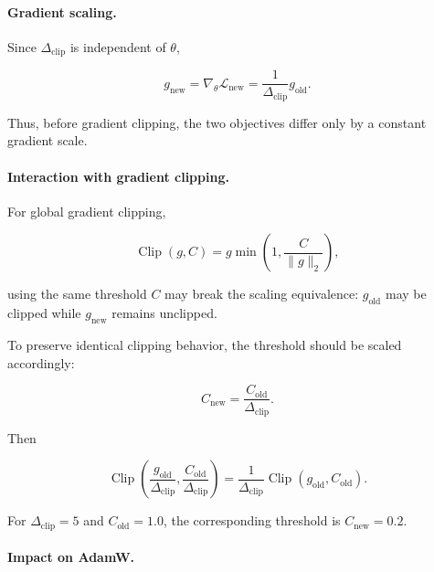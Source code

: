 \documentclass{article} %
\begin{document}
\paragraph{Gradient scaling.}

Since $\Delta_{\mathrm{clip}}$ is independent of $\theta$,

\begin{equation}
g_{\mathrm{new}}
=
\nabla_\theta \mathcal{L}_{\mathrm{new}}
=
\frac{1}{\Delta_{\mathrm{clip}}}
g_{\mathrm{old}}.
\end{equation}

Thus, before gradient clipping, the two objectives differ only by a constant gradient scale.

\paragraph{Interaction with gradient clipping.}

For global gradient clipping,

\begin{equation}
\operatorname{Clip}(g,C)
=
g\min\left(1,\frac{C}{\|g\|_2}\right),
\end{equation}

using the same threshold $C$ may break the scaling equivalence: $g_{\mathrm{old}}$ may be clipped while $g_{\mathrm{new}}$ remains unclipped.

To preserve identical clipping behavior, the threshold should be scaled accordingly:

\begin{equation}
C_{\mathrm{new}}
=
\frac{C_{\mathrm{old}}}{\Delta_{\mathrm{clip}}}.
\end{equation}

Then

\begin{equation}
\operatorname{Clip}
\left(
\frac{g_{\mathrm{old}}}{\Delta_{\mathrm{clip}}},
\frac{C_{\mathrm{old}}}{\Delta_{\mathrm{clip}}}
\right)
=
\frac{1}{\Delta_{\mathrm{clip}}}
\operatorname{Clip}
\left(
g_{\mathrm{old}},
C_{\mathrm{old}}
\right).
\end{equation}

For $\Delta_{\mathrm{clip}}=5$ and $C_{\mathrm{old}}=1.0$, the corresponding threshold is $C_{\mathrm{new}}=0.2$.

\paragraph{Impact on AdamW.}
\end{document}
